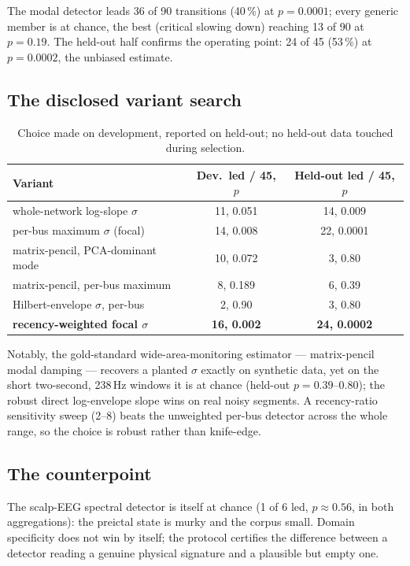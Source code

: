 \documentclass[aip,cha,preprint,amsmath,amssymb]{revtex4-2}
\begin{document}
The modal detector leads 36 of 90 transitions (40\,\%) at $p = 0.0001$;
every generic member is at chance, the best (critical slowing down)
reaching 13 of 90 at $p = 0.19$. The held-out half confirms the
operating point: 24 of 45 (53\,\%) at $p = 0.0002$, the unbiased
estimate.

\subsection{The disclosed variant search}\label{sec:variants}

\begin{table}[h!]
\centering
\scriptsize
\setlength{\tabcolsep}{3pt}
\begin{tabular}{lcc}
\toprule
Variant & Dev.\ led / 45, $p$ & Held-out led / 45, $p$ \\
\midrule
whole-network log-slope $\sigma$ & 11, 0.051 & 14, 0.009 \\
per-bus maximum $\sigma$ (focal) & 14, 0.008 & 22, 0.0001 \\
matrix-pencil, PCA-dominant mode & 10, 0.072 & 3, 0.80 \\
matrix-pencil, per-bus maximum & 8, 0.189 & 6, 0.39 \\
Hilbert-envelope $\sigma$, per-bus & 2, 0.90 & 3, 0.80 \\
\textbf{recency-weighted focal $\sigma$} & \textbf{16, 0.002} & \textbf{24, 0.0002} \\
\bottomrule
\end{tabular}
\caption{Choice made on development, reported on held-out; no held-out
data touched during selection.}
\label{tab:variants}
\end{table}

Notably, the gold-standard wide-area-monitoring estimator ---
matrix-pencil modal damping --- recovers a planted $\sigma$ exactly on
synthetic data, yet on the short two-second, 238\,Hz windows it is at
chance (held-out $p = 0.39$--$0.80$); the robust direct log-envelope
slope wins on real noisy segments. A recency-ratio sensitivity sweep
(2--8) beats the unweighted per-bus detector across the whole range, so
the choice is robust rather than knife-edge.

\subsection{The counterpoint}

The scalp-EEG spectral detector is itself at chance (1 of 6 led,
$p \approx 0.56$, in both aggregations): the preictal state is murky
and the corpus small. Domain specificity does not win by itself; the
protocol certifies the difference between a detector reading a genuine
physical signature and a plausible but empty one.
\end{document}
